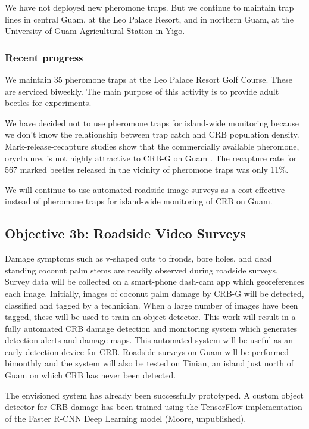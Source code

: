 \documentclass[12pt,letterpaper,english,bibliography=totocnumbered, abstract=on]{scrartcl}
\begin{document}
We have not deployed new pheromone traps. But we continue to maintain trap lines in central Guam, at the Leo Palace Resort, and in northern Guam, at the University of Guam Agricultural Station in Yigo.

\subsubsection{Recent progress}

We maintain 35 pheromone traps at the Leo Palace Resort Golf Course. These are serviced biweekly. The main purpose of this activity is to provide adult beetles for experiments.

We have decided not to use pheromone traps for island-wide monitoring because we don't know the relationship between trap catch and CRB population density. Mark-release-recapture studies show that the commercially available pheromone, oryctalure, is not highly attractive to CRB-G on Guam \cite{siderhurstEffectsUltravioletLight2021}. The recapture rate for 567 marked beetles released in the vicinity of pheromone traps was only 11\%.

We will continue to use automated roadside image surveys as a cost-effective instead of pheromone traps for island-wide monitoring of CRB on Guam. 



\clearpage
\subsection{Objective 3b: Roadside Video Surveys}

\begin{framed}
Damage symptoms such as v-shaped cuts to fronds, bore holes, and dead standing coconut palm stems are readily observed during roadside surveys. Survey data will be collected on a smart-phone dash-cam app which georeferences each image. Initially, images of coconut palm damage by CRB-G will be detected, classified and tagged by a technician. When a large number of images have been tagged, these will be used to train an object detector. This work will result in a fully automated CRB damage detection and monitoring system which generates detection alerts and damage maps. This automated system will be useful as an early detection device for CRB. Roadside surveys on Guam will be performed bimonthly and the system will also be tested on Tinian, an island just north of Guam on which CRB has never been detected.

The envisioned system has already been successfully prototyped. A custom object detector for CRB damage has been trained using the TensorFlow implementation of the Faster R-CNN Deep Learning model (Moore, unpublished).
\end{framed}
\end{document}
